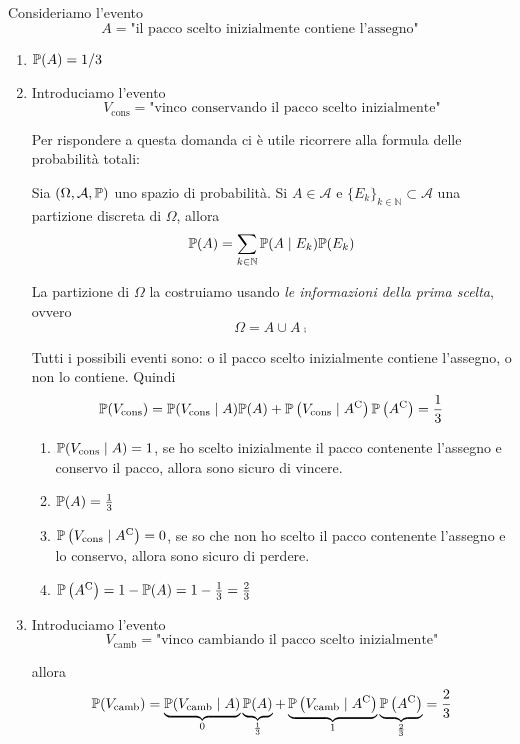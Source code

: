 Consideriamo l'evento
\begin{equation*}
A=\text{"il pacco scelto inizialmente contiene l'assegno"}
\end{equation*}
\begin{enumerate}
\item $\mathbb{P}( A) =1/3$
\item Introduciamo l'evento\begin{equation*}
V_{\text{cons}} =\text{"vinco conservando il pacco scelto inizialmente"}
\end{equation*}

Per rispondere a questa domanda ci è utile ricorrere alla formula delle probabilità totali:\begin{theorem}
Sia $( \Omega ,\mathcal{A} ,\mathbb{P})$ uno spazio di probabilità. Si $A\in \mathcal{A}$ e $\{E_{k}\}_{k\in \mathbb{N}} \subset \mathcal{A}$ una partizione discreta di $\Omega $, allora
\begin{equation*}
\mathbb{P}( A) =\sum\limits _{k\in \mathbb{N}}\mathbb{P}( A\mid E_{k})\mathbb{P}( E_{k})
\end{equation*}
\end{theorem}

La partizione di $\Omega $ la costruiamo usando \textit{le informazioni della prima scelta}, ovvero\begin{equation*}
\Omega =A\cup A\comp
\end{equation*}

Tutti i possibili eventi sono: o il pacco scelto inizialmente contiene l'assegno, o non lo contiene. Quindi\begin{equation*}
\mathbb{P}( V_{\text{cons}}) =\mathbb{P}( V_{\text{cons}} \mid A)\mathbb{P}( A) +\mathbb{P}\left( V_{\text{cons}} \mid A^{\mathrm{C}}\right)\mathbb{P}\left( A^{\mathrm{C}}\right) =\frac{1}{3}
\end{equation*}
\begin{enumerate}
\item $\mathbb{P}( V_{\text{cons}} \mid A) =1$, se ho scelto inizialmente il pacco contenente l'assegno e conservo il pacco, allora sono sicuro di vincere.
\item $\mathbb{P}( A) =\frac{1}{3}$
\item $\mathbb{P}\left( V_{\text{cons}} \mid A^{\mathrm{C}}\right) =0$, se so che non ho scelto il pacco contenente l'assegno e lo conservo, allora sono sicuro di perdere.
\item $\mathbb{P}\left( A^{\mathrm{C}}\right) =1-\mathbb{P}( A) =1-\frac{1}{3} =\frac{2}{3}$
\end{enumerate}
\item Introduciamo l'evento\begin{equation*}
V_{\text{camb}} =\text{"vinco cambiando il pacco scelto inizialmente"}
\end{equation*}

allora\begin{equation*}
\mathbb{P}( V_{\text{camb}}) =\underbrace{\mathbb{P}( V_{\text{camb}} \mid A)}_{0}\underbrace{\mathbb{P}( A)}_{\frac{1}{3}} +\underbrace{\mathbb{P}\left( V_{\text{camb}} \mid A^{\mathrm{C}}\right)}_{1}\underbrace{\mathbb{P}\left( A^{\mathrm{C}}\right)}_{\frac{2}{3}} =\frac{2}{3}
\end{equation*}
\end{enumerate}

